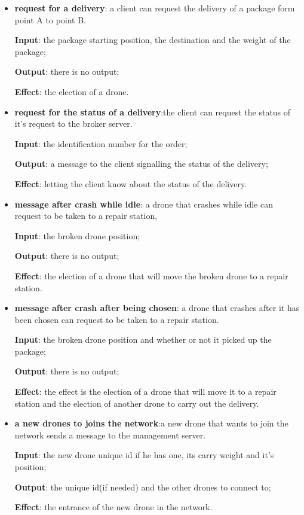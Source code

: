 \documentclass[a4paper, oneside]{memoir}
\begin{document}
\begin{itemize}
\item \textbf{request for a delivery}: a client can request the delivery of a package form point A to point B.

	\textbf{Input}: the package starting position, the destination and the weight of the package;

	\textbf{Output}: there is no output;

	\textbf{Effect}: the election of a drone.

\item \textbf{request for the status of a delivery}:the client can request the status of it's request to the broker server.

 	\textbf{Input}: the identification number for the order;

	\textbf{Output}: a message to the client signalling the status of the delivery;

	\textbf{Effect}: letting the client know about the status of the delivery.

\item \textbf{message after crash while idle}: a drone that crashes while idle can request to be taken to a repair station,

	\textbf{Input}: the broken drone position;

	\textbf{Output}: there is no output;

	\textbf{Effect}: the election of a drone that will move the broken drone to a repair station.

\item \textbf{message after crash after being chosen}: a drone that crashes after it has been chosen can request to be taken to a repair station.

	\textbf{Input}: the broken drone position and whether or not it picked up the package;

	\textbf{Output}: there is no output;

	\textbf{Effect}: the effect is the election of a drone that will move it to a repair station and the election of another drone to carry out the delivery.

\item \textbf{a new drones to joins the network}:a new drone that wants to join the network sends a message to the management server.

	\textbf{Input}: the new drone unique id if he has one, its carry weight and it's position;

	\textbf{Output}: the unique id(if needed) and the other drones to connect to;

	\textbf{Effect}: the entrance of the new drone in the network.

\end{itemize}
\end{document}
